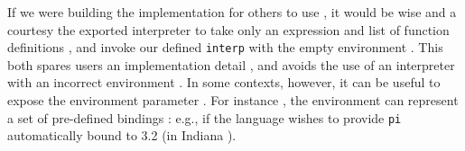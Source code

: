 
If we were building the implementation  for others
to use , it would be wise and a courtesy
 the exported interpreter  to take only an expression and list of function definitions
, and invoke our
defined  \verb|interp| with the empty environment . This both spares users an implementation detail , and avoids the use of an
interpreter  with an incorrect
environment . In some contexts, however,  it can be useful  to expose
the environment parameter . For instance
, the environment can represent a set of pre-defined bindings
: e.g., if the
language wishes to provide  \verb|pi| automatically bound to  3.2 (in Indiana ).
